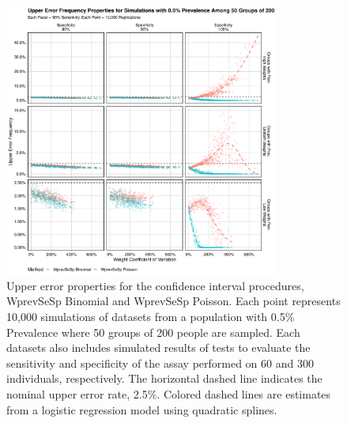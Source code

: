 \documentclass[AMA,STIX1COL]{WileyNJD-v2}
\begin{document}
\begin{figure}
\centering
\includegraphics[width=0.8\textwidth]{figures/imperfect_upper_error_frequency_50_groups_0_005_prev.pdf}
\caption{Upper error properties for the confidence interval procedures, WprevSeSp Binomial and WprevSeSp Poisson.
Each point represents 10,000 simulations of datasets from a population with 0.5\% Prevalence where 50 groups of 200 people are sampled.
Each datasets also includes simulated results of tests to evaluate the sensitivity and specificity of the assay performed on 60 and 300 individuals, respectively.
The horizontal dashed line indicates the nominal upper error rate, 2.5\%.
Colored dashed lines are estimates from a logistic regression model using quadratic splines.}
\label{fig:imperfect_upper_error_frequency_50_groups_0_005_prev}
\end{figure}
\end{document}
